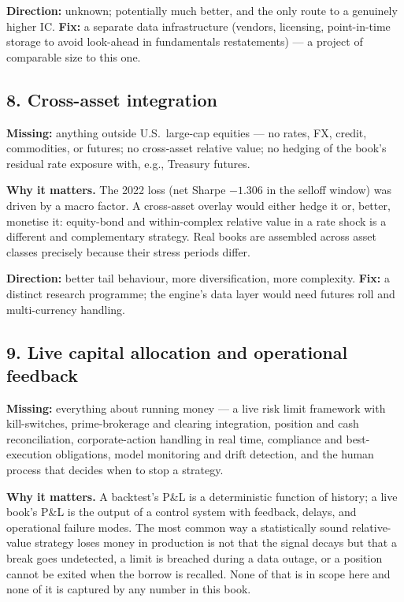 \textbf{Direction:} unknown; potentially much better, and the only route to a genuinely
higher IC. \textbf{Fix:} a separate data infrastructure (vendors, licensing, point-in-time
storage to avoid look-ahead in fundamentals restatements) --- a project of comparable size to
this one.

\subsection{8. Cross-asset integration}

\textbf{Missing:} anything outside U.S.\ large-cap equities --- no rates, FX, credit,
commodities, or futures; no cross-asset relative value; no hedging of the book's residual
rate exposure with, e.g., Treasury futures.

\textbf{Why it matters.} The 2022 loss (net Sharpe $-1.306$ in the selloff window) was
driven by a macro factor. A cross-asset overlay would either hedge it or, better, monetise
it: equity-bond and within-complex relative value in a rate shock is a different and
complementary strategy. Real books are assembled across asset classes precisely because
their stress periods differ.

\textbf{Direction:} better tail behaviour, more diversification, more complexity.
\textbf{Fix:} a distinct research programme; the engine's data layer would need futures roll
and multi-currency handling.

\subsection{9. Live capital allocation and operational feedback}

\textbf{Missing:} everything about running money --- a live risk limit framework with
kill-switches, prime-brokerage and clearing integration, position and cash reconciliation,
corporate-action handling in real time, compliance and best-execution obligations, model
monitoring and drift detection, and the human process that decides when to stop a strategy.

\textbf{Why it matters.} A backtest's P\&L is a deterministic function of history; a live
book's P\&L is the output of a control system with feedback, delays, and operational
failure modes. The most common way a statistically sound relative-value strategy loses money
in production is not that the signal decays but that a break goes undetected, a limit is
breached during a data outage, or a position cannot be exited when the borrow is recalled.
None of that is in scope here and none of it is captured by any number in this book.

